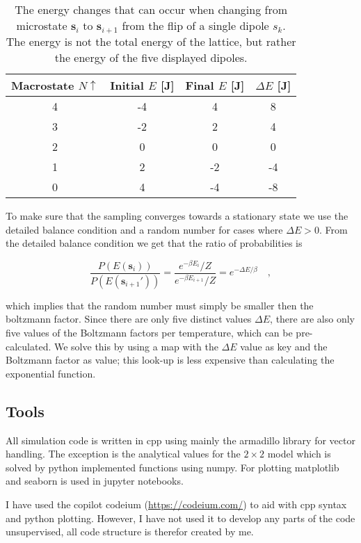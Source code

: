 \documentclass[../main_proj4_correct_template.tex]{subfiles}
\begin{document}
\begin{table}[h!]
\caption{The energy changes that can occur when changing from microstate $\mathbf{s}_i$ to $\mathbf{s}_{i+1}$ from the flip of a single dipole $s_k$. The energy is not the total energy of the lattice, but rather the energy of the five displayed dipoles.}
\label{tab:p4_delE}
\begin{tabular}{cccc}
\toprule
Macrostate $N\uparrow$  & Initial $E$ [J]   & Final $E$ [J] & $\Delta E$ [J] \\ \midrule
4                       & -4                & 4             &     8          \\
3                       & -2                &  2            & 4              \\
2                       & 0                 & 0             & 0              \\
1                       & 2                 & -2            & -4             \\
0                       & 4                 & -4            & -8             \\
\bottomrule
\end{tabular}
\end{table}

To make sure that the sampling converges towards a stationary state we use the detailed balance condition and a random number for cases where $\Delta E > 0$. From the detailed balance condition we get that the ratio of probabilities is 

$$
\frac{P(E(\mathbf{s}_i))}{P(E(\mathbf{s}_{i+1}'))} 
= \frac{e^{-\beta E_i}/Z}{e^{-\beta E_{i+1}}/ Z} = e^{-\Delta E/\beta} \quad,
$$

\noindent which implies that the random number must simply be smaller then the boltzmann factor. Since there are only five distinct values $\Delta E$, there are also only five values of the Boltzmann factors per temperature, which can be pre-calculated. We solve this by using a map with the $\Delta E$ value as key and the Boltzmann factor as value; this look-up is less expensive than calculating the exponential function. 


\subsection{Tools}

All simulation code is written in cpp using mainly the armadillo library for vector handling. The exception is the analytical values for the $2\times 2$ model which is solved by python implemented functions using numpy. For plotting matplotlib and seaborn is used in jupyter notebooks. 

I have used the copilot codeium (\href{https://codeium.com/}{https://codeium.com/}) to aid with cpp syntax and python plotting. However, I have not used it to develop any parts of the code unsupervised, all code structure is therefor created by me.
\end{document}
